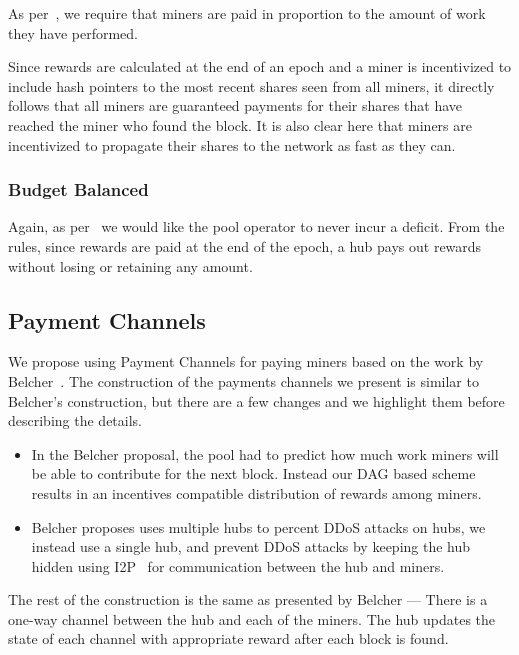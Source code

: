 \documentclass{article}
\begin{document}
As per~\cite{incentives-compatible}, we require that miners are paid
in proportion to the amount of work they have performed.

Since rewards are calculated at the end of an epoch and a miner is
incentivized to include hash pointers to the most recent shares seen
from all miners, it directly follows that all miners are guaranteed
payments for their shares that have reached the miner who found the
block. It is also clear here that miners are incentivized to propagate
their shares to the network as fast as they can.

\subsubsection{Budget Balanced}\label{sec:budget-balanced}

Again, as per~\cite{incentives-compatible} we would like the pool
operator to never incur a deficit. From the rules, since rewards are
paid at the end of the epoch, a hub pays out rewards without losing or
retaining any amount.

\subsection{Payment Channels}\label{ref:channels}

We propose using Payment Channels for paying miners based on the work
by Belcher~\cite{channels-for-rewards}. The construction of the
payments channels we present is similar to Belcher's construction, but
there are a few changes and we highlight them before describing the
details.

\begin{itemize}
\item In the Belcher proposal, the pool had to predict how much work
  miners will be able to contribute for the next block. Instead our
  DAG based scheme results in an incentives compatible distribution of
  rewards among miners.
\item Belcher proposes uses multiple hubs to percent DDoS attacks on
  hubs, we instead use a single hub, and prevent DDoS attacks by keeping the
  hub hidden using I2P~\cite{i2p, i2p-censorship-resistance} for
  communication between the hub and miners.
\end{itemize}

The rest of the construction is the same as presented by Belcher ---
There is a one-way channel between the hub and each of the miners. The
hub updates the state of each channel with appropriate reward after
each block is found.
\end{document}
